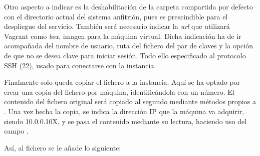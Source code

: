 Otro aspecto a indicar es la deshabilitación de la carpeta compartida por defecto  con el directorio actual del sistema anfitrión, pues es prescindible para el despliegue del servicio. También será necesario indicar la \textit{url} que utilizará Vagrant como \textit{box}, imagen para la máquina virtual. Dicha indicación ha de ir acompañada del nombre de usuario, ruta del fichero del par de claves y la opción de que no se desea clave para iniciar sesión. Todo ello especificado al protocolo SSH (22), usado para conectarse con la instancia.

Finalmente solo queda copiar el fichero  a la instancia. Aquí se ha optado por crear una copia del fichero  por máquina, identificándola con un número. El contenido del fichero original será copiado al segundo mediante métodos propios a . Una vez hecha la copia, se indica la dirección IP que la máquina va adquirir, siendo 10.0.0.10X, y se pasa el contenido mediante su lectura, haciendo uso del campo .

Así, al fichero  se le añade lo siguiente:

